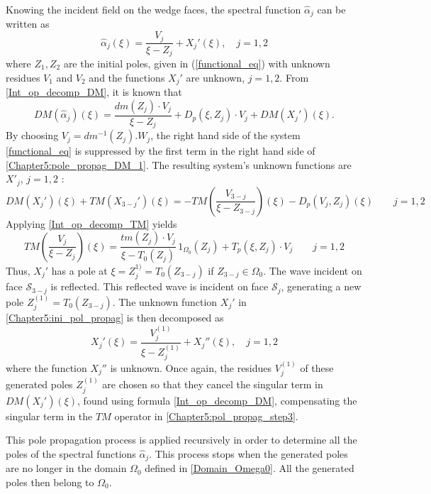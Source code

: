 Knowing the incident field on the wedge faces, the spectral function  $\hat{\alpha}_j$ can be written as
\begin{equation}
\label{Chapter5:ini_pol_propag}
\hat{\alpha}_j(\xi) = \dfrac{V_j}{\xi - Z_j} + X_j'(\xi), \quad j=1,2
\end{equation}
where $Z_1,Z_2$ are the initial poles, given in (\ref{functional_eq}) with unknown residues $V_1$ and $V_2$ and the functions $X_j'$ are unknown, $j=1,2$. From \eqref{Int_op_decomp_DM}, it is known that
\begin{equation}
\label{Chapter5:pole_propag_DM_1}
DM(\hat{\alpha}_j)(\xi) = \dfrac{dm(Z_j) \cdot V_j}{\xi - Z_j} + D_p(\xi,Z_j)\cdot V_j + DM( X_j')(\xi).
\end{equation}
By choosing $V_j =  dm^{-1}(Z_j).W_j$, the right hand side of the system \eqref{functional_eq} is suppressed by the first term in the right hand side of \eqref{Chapter5:pole_propag_DM_1}. The resulting system's unknown functions are $X'_j, \, j=1,2$ :
\begin{equation}
DM  (X_j' )(\xi)+ TM (X_{3-j}' )(\xi) = - TM  \left(  \dfrac{V_{3-j}}{\xi - Z_{3-j}} \right) (\xi)  - D_p(V_j,Z_j)(\xi) \qquad j=1,2
\end{equation}
Applying \eqref{Int_op_decomp_TM} yields
\begin{equation}
\label{Chapter5:pol_propag_step3}
TM  \left(  \dfrac{V_j}{\xi - Z_j} \right)(\xi) = \dfrac{tm(Z_j) \cdot V_j}{\xi - T_0(Z_j)}  \, 1_{\Omega_0}(Z_j) + T_p(\xi,Z_j)\cdot V_j \qquad j=1,2
\end{equation}
Thus, $X_j'$ has a pole at $\xi = Z_j^{1)} = T_0(Z_{3-j})$ if $Z_{3-j} \in \Omega_0$. The wave incident on face $\mathcal{S}_{3-j}$ is reflected. This reflected wave is incident on face $\mathcal{S}_j$, generating a new pole $Z_j^{(1)}=T_0(Z_{3-j})$. 
The unknown function $X_j'$ in \eqref{Chapter5:ini_pol_propag} is then decomposed as
\begin{equation}
\label{Chapter5:pol_propag_step2}
X_j'(\xi) =  \dfrac{V_j^{(1)}}{\xi - Z_j^{(1)}} + X_j''(\xi), \quad j=1,2
\end{equation}
where the function $ X_j''$ is unknown. 
Once again, the residues $V_j^{(1)}$ of these generated poles $Z_j^{(1)}$ are chosen so that they cancel the singular term in $DM(X_j')(\xi)$, found using formula \eqref{Int_op_decomp_DM}, compensating the singular term in the $TM$ operator in \eqref{Chapter5:pol_propag_step3}.

This pole propagation process is applied recursively in order to determine all the poles of the spectral functions $\hat{\alpha}_j$. This process stops when the generated poles are no longer in the domain $\Omega_0$ defined in \eqref{Domain_Omega0}. All the generated poles then belong to $\Omega_0$. 

